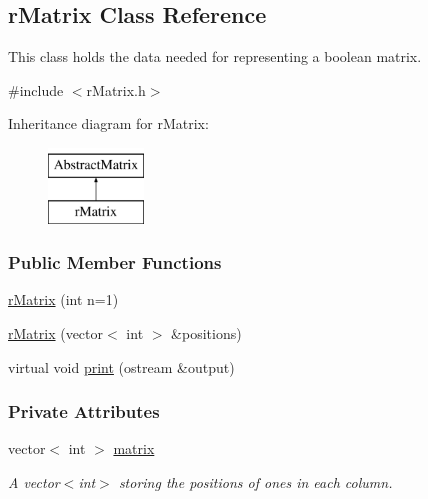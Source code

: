\hypertarget{classr_matrix}{\subsection{r\+Matrix Class Reference}
\label{classr_matrix}
}


This class holds the data needed for representing a boolean matrix.  




{\ttfamily \#include $<$r\+Matrix.\+h$>$}

Inheritance diagram for r\+Matrix\+:\begin{figure}[H]
\begin{center}
\leavevmode
\includegraphics[height=2.000000cm]{classr_matrix}
\end{center}
\end{figure}
\subsubsection*{Public Member Functions}
\begin{DoxyCompactItemize}
\item 
\hyperlink{classr_matrix_afb32c7699d7dff3dd143f42ab42d09d4}{r\+Matrix} (int n=1)
\item 
\hyperlink{classr_matrix_a2a4aff28e459377c12b3d818fd26374c}{r\+Matrix} (vector$<$ int $>$ \&positions)
\item 
virtual void \hyperlink{classr_matrix_a2a22671198a516a8165306d5406e539b}{print} (ostream \&output)
\end{DoxyCompactItemize}
\subsubsection*{Private Attributes}
\begin{DoxyCompactItemize}
\item 
\hypertarget{classr_matrix_a88d428b77fd5dbecaf0e852cfe84547b}{vector$<$ int $>$ \hyperlink{classr_matrix_a88d428b77fd5dbecaf0e852cfe84547b}{matrix}}\label{classr_matrix_a88d428b77fd5dbecaf0e852cfe84547b}

\begin{DoxyCompactList}\small\item\em A vector$<$int$>$ storing the positions of ones in each column. \end{DoxyCompactList}\end{DoxyCompactItemize}
